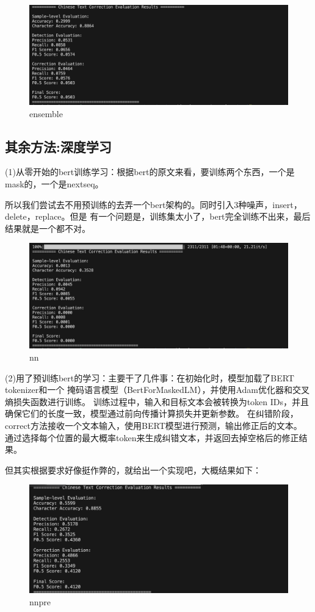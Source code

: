 \documentclass[answers]{exam}  %
\begin{document}
\begin{figure}[H]
    \centering
    \label{ensemble}
    \includegraphics[width=.6\textwidth]{../pic/ensemble.png} 
    \caption{ensemble}  
\end{figure}



\subsection{其余方法:深度学习}
\medskip
(1)从零开始的bert训练学习：根据bert的原文来看，要训练两个东西，一个是mask的，一个是nextseq。

所以我们尝试去不用预训练的去弄一个bert架构的。同时引入3种噪声，insert，delete，replace。但是
有一个问题是，训练集太小了，bert完全训练不出来，最后结果就是一个都不对。

\begin{figure}[H]
    \centering
    \label{nn}
    \includegraphics[width=.6\textwidth]{../pic/nn.png} 
    \caption{nn}  
\end{figure}

\medskip
(2)用了预训练bert的学习：主要干了几件事：在初始化时，模型加载了BERT tokenizer和一个
掩码语言模型（BertForMaskedLM），并使用Adam优化器和交叉熵损失函数进行训练。
训练过程中，输入和目标文本会被转换为token IDs，并且确保它们的长度一致，模型通过前向传播计算损失并更新参数。
在纠错阶段，correct方法接收一个文本输入，使用BERT模型进行预测，输出修正后的文本。
通过选择每个位置的最大概率token来生成纠错文本，并返回去掉空格后的修正结果。

但其实根据要求好像挺作弊的，就给出一个实现吧，大概结果如下：

\begin{figure}[H]
    \centering
    \label{nnpre}
    \includegraphics[width=.6\textwidth]{../pic/nnpre.png} 
    \caption{nnpre}  
\end{figure}
\end{document}
